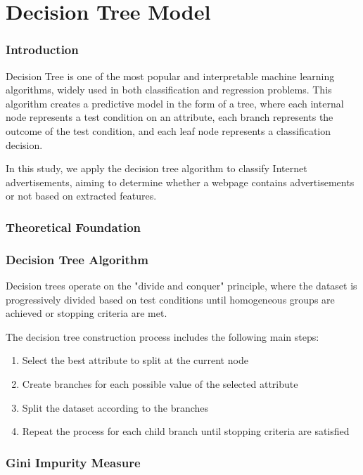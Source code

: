 \section{Decision Tree Model}

\subsubsection{Introduction}

Decision Tree is one of the most popular and interpretable machine learning algorithms, widely used in both classification and regression problems. This algorithm creates a predictive model in the form of a tree, where each internal node represents a test condition on an attribute, each branch represents the outcome of the test condition, and each leaf node represents a classification decision.

In this study, we apply the decision tree algorithm to classify Internet advertisements, aiming to determine whether a webpage contains advertisements or not based on extracted features.

\subsubsection{Theoretical Foundation}

\subsubsection{Decision Tree Algorithm}

Decision trees operate on the "divide and conquer" principle, where the dataset is progressively divided based on test conditions until homogeneous groups are achieved or stopping criteria are met.

The decision tree construction process includes the following main steps:
\begin{enumerate}
    \item Select the best attribute to split at the current node
    \item Create branches for each possible value of the selected attribute
    \item Split the dataset according to the branches
    \item Repeat the process for each child branch until stopping criteria are satisfied
\end{enumerate}

\subsubsection{Gini Impurity Measure}

